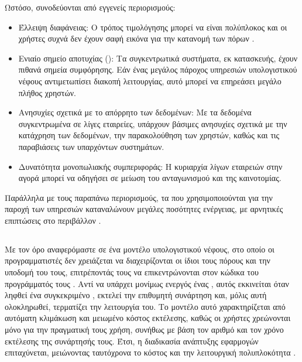 Ωστόσο, συνοδεύονται από εγγενείς περιορισμούς:
\begin{itemize}
\item Έλλειψη διαφάνειας: Ο τρόπος τιμολόγησης μπορεί να είναι πολύπλοκος και οι 
χρήστες συχνά δεν έχουν σαφή εικόνα για την κατανομή των πόρων \cite{ref3,ref4,ref5} .
\item Ενιαίο σημείο αποτυχίας (): Τα συγκεντρωτικά 
συστήματα, εκ κατασκευής, έχουν πιθανά σημεία συμφόρησης. Εάν ένας μεγάλος 
πάροχος υπηρεσιών υπολογιστικού νέφους αντιμετωπίσει διακοπή λειτουργίας, 
αυτό μπορεί να επηρεάσει μεγάλο πλήθος χρηστών.
\item Ανησυχίες σχετικά με το απόρρητο των δεδομένων: Με τα δεδομένα 
συγκεντρωμένα σε λίγες εταιρείες, υπάρχουν βάσιμες ανησυχίες σχετικά με την 
κατάχρηση των δεδομένων, την παρακολούθηση των χρηστών, καθώς και τις παραβιάσεις των υπαρχόντων συστημάτων.
\item Δυνατότητα μονοπωλιακής συμπεριφοράς: Η κυριαρχία λίγων εταιρειών στην 
αγορά μπορεί να οδηγήσει σε μείωση του ανταγωνισμού και της καινοτομίας.
\end{itemize}

Παράλληλα με τους παραπάνω περιορισμούς, τα  που χρησιμοποιούνται
για την παροχή των υπηρεσιών  καταναλώνουν μεγάλες ποσότητες
ενέργειας, με αρνητικές επιπτώσεις στο περιβάλλον \cite{ref40, ref41}. 

\subsection{}
Με τον όρο  αναφερόμαστε σε ένα μοντέλο υπολογιστικού νέφους, στο οποίο οι προγραμματιστές δεν χρειάζεται να διαχειρίζονται οι ίδιοι τους πόρους και την υποδομή του  τους, επιτρέποντάς τους να επικεντρώνονται στον κώδικα του προγράμματός τους \cite{ref6}. Αντί να υπάρχει μονίμως ενεργός ένας , αυτός εκκινείται όταν ληφθεί ένα συγκεκριμένο , εκτελεί την επιθυμητή συνάρτηση και, μόλις αυτή ολοκληρωθεί, τερματίζει την λειτουργία του. Το μοντέλο αυτό χαρακτηρίζεται από αυτόματη κλιμάκωση και μειωμένο κόστος εκτέλεσης, καθώς οι χρήστες χρεώνονται μόνο για την πραγματική τους χρήση, συνήθως με βάση τον αριθμό και τον χρόνο εκτέλεσης της συνάρτησής τους. Έτσι, η διαδικασία ανάπτυξης εφαρμογών επιταχύνεται, μειώνοντας ταυτόχρονα το κόστος και την λειτουργική πολυπλοκότητα \cite{ref7,ref8}. 


\section{}
